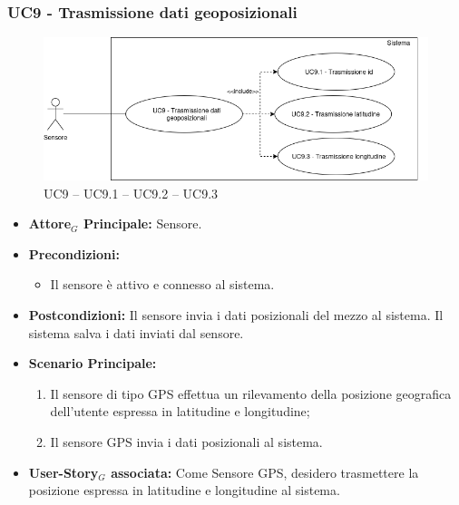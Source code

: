 \documentclass[11pt]{article}
\begin{document}
\begin{justify}
\subsubsection{\textbf{UC9 - Trasmissione dati geoposizionali}}
\begin{figure}[H]
    \centering
    \includegraphics[width=0.7\linewidth]{UC9image.png}
    \caption{UC9 -- UC9.1 -- UC9.2 -- UC9.3}
    \label{fig:UC9}
\end{figure}
\label{UC9}
\begin{itemize}
    \item \textbf{Attore$_G$ Principale:} Sensore.
    \item \textbf{Precondizioni:} 
        \begin{itemize}
    	\item Il sensore è attivo e connesso al sistema.
        \end{itemize}
    \item \textbf{Postcondizioni:} Il sensore invia i dati posizionali del mezzo al sistema. Il sistema salva i dati inviati dal sensore. 
    \item \textbf{Scenario Principale:} 
        \begin{enumerate}
            \item Il sensore di tipo GPS effettua un rilevamento della posizione geografica dell'utente espressa in latitudine e longitudine;
            \item Il sensore GPS invia i dati posizionali al sistema.
        \end{enumerate}
    \item \textbf{User-Story$_G$ associata:} Come Sensore GPS, desidero trasmettere la posizione espressa in latitudine e longitudine al sistema.
\end{itemize}

\end{justify}
\end{document}
